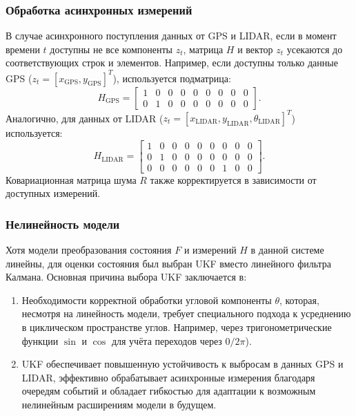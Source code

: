 \subsubsection{Обработка асинхронных измерений}
\label{subsec:async_measurements}

В случае асинхронного поступления данных от GPS и LIDAR, если в момент времени \(t\) доступны 
не все компоненты \({z}_t\), 
матрица \({H}\) и вектор \({z}_t\) усекаются до соответствующих строк и элементов. 
Например, если доступны только данные GPS (\({z}_t = [x_{\text{GPS}}, y_{\text{GPS}}]^T\)), используется подматрица:
\[
{H}_{\text{GPS}} =
\begin{bmatrix}
1 & 0 & 0 & 0 & 0 & 0 & 0 & 0 & 0 \\
0 & 1 & 0 & 0 & 0 & 0 & 0 & 0 & 0
\end{bmatrix}.
\]
Аналогично, для данных от LIDAR (\({z}_t = [x_{\text{LIDAR}}, y_{\text{LIDAR}}, \theta_{\text{LIDAR}}]^T\)) используется:
\[
{H}_{\text{LIDAR}} =
\begin{bmatrix}
1 & 0 & 0 & 0 & 0 & 0 & 0 & 0 & 0 \\
0 & 1 & 0 & 0 & 0 & 0 & 0 & 0 & 0 \\
0 & 0 & 0 & 0 & 0 & 0 & 1 & 0 & 0
\end{bmatrix}.
\]
Ковариационная матрица шума \({R}\) также корректируется в зависимости от доступных измерений.


\subsubsection{Нелинейность модели}
\label{sec:ukf_choice}

Хотя модели преобразования состояния \({F}\) и измерений \({H}\) в данной системе линейны,
для оценки состояния был выбран UKF вместо линейного фильтра Калмана. Основная причина выбора UKF заключается в:
\begin{enumerate}[label=\arabic*]
	\item Необходимости корректной обработки угловой компоненты \(\theta\), 
		которая, несмотря на линейность модели, требует специального подхода к усреднению в циклическом пространстве углов.
		Например, через тригонометрические функции \(\sin\) и \(\cos\) для учёта переходов через \(0/2\pi\)).
	\item UKF обеспечивает повышенную устойчивость к выбросам в данных GPS и LIDAR, 
		эффективно обрабатывает асинхронные измерения благодаря очередям событий и обладает гибкостью для адаптации к
		возможным нелинейным расширениям модели в будущем.
\end{enumerate}


